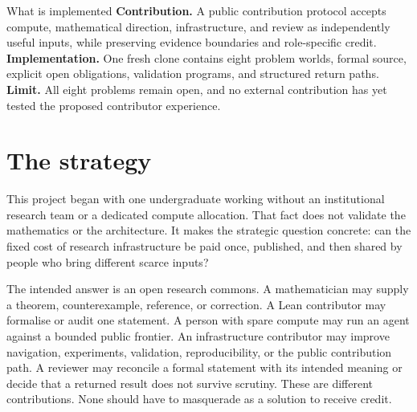 \documentclass[10pt]{article}
\begin{document}
\begin{abstract}
The paper gives a production model, contribution protocol, trust and security
boundary, attribution policy, comparison with volunteer computing,
Polymath-style collaboration, formalisation projects, and multi-agent proof
systems, and an evaluation agenda.  Mathematics is the initial domain because
its objects are digital and formal claims can be checked incrementally.  Any
later extension to experimental science would require domain scientists,
physical laboratories, safety governance, and new evidential authorities.
\end{abstract}

\begin{paperresult}{What is implemented}
\textbf{Contribution.} A public contribution protocol accepts compute,
mathematical direction, infrastructure, and review as independently useful
inputs, while preserving evidence boundaries and role-specific credit.
\textbf{Implementation.} One fresh clone contains eight problem worlds,
formal source, explicit open obligations, validation programs, and structured
return paths.  \textbf{Limit.} All eight problems remain open, and no external
contribution has yet tested the proposed contributor experience.
\end{paperresult}

\section{The strategy}\label{sec:strategy}

This project began with one undergraduate working without an institutional
research team or a dedicated compute allocation.  That fact does not validate
the mathematics or the architecture.  It makes the strategic question
concrete: can the fixed cost of research infrastructure be paid once,
published, and then shared by people who bring different scarce inputs?

The intended answer is an open research commons.  A mathematician may supply
a theorem, counterexample, reference, or correction.  A Lean contributor may
formalise or audit one statement.  A person with spare compute may run an
agent against a bounded public frontier.  An infrastructure contributor may
improve navigation, experiments, validation, reproducibility, or the public
contribution path.  A reviewer may reconcile a formal statement with its
intended meaning or decide that a returned result does not survive scrutiny.
These are different contributions.  None should have to masquerade as a
solution to receive credit.
\end{document}

